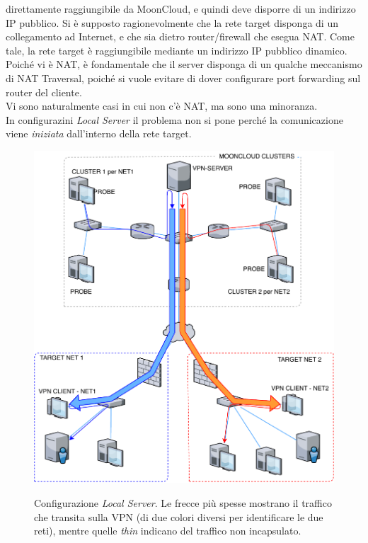 direttamente raggiungibile da MoonCloud, e quindi deve disporre di un indirizzo IP pubblico.
Si è supposto ragionevolmente che la rete target disponga di un collegamento ad Internet, e che
sia dietro router/firewall che esegua NAT. Come tale, la rete target è raggiungibile
mediante un indirizzo IP pubblico dinamico. Poiché vi è NAT, è fondamentale che il server disponga
di un qualche meccanismo di NAT Traversal, poiché si vuole evitare di dover configurare
port forwarding sul router del cliente.\\
Vi sono naturalmente casi in cui non c'è NAT, ma sono una minoranza.\\
In configurazini \textit{Local Server} il problema non si pone perché la comunicazione viene
\textit{iniziata} dall'interno della rete target.

\begin{figure}
  \includegraphics[scale=0.6]{img/ls}
  \label{fig:ls}
  \caption[Configurazione \textit{Local Server}]{Configurazione \textit{Local Server}. Le frecce
  più spesse mostrano il traffico che transita sulla VPN (di due colori diversi per identificare
  le due reti), mentre quelle \textit{thin} indicano del traffico non incapsulato.}
\end{figure}

